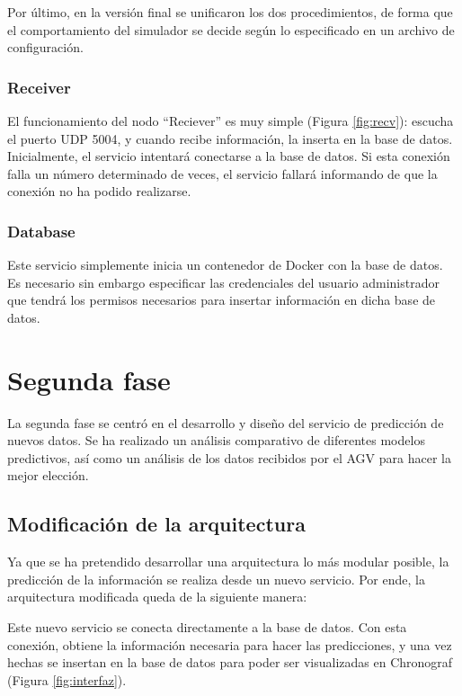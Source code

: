 Por último, en la versión final se unificaron los dos procedimientos, de forma que el comportamiento del simulador
se decide según lo especificado en un archivo de configuración.

\subsubsection{Receiver}

El funcionamiento del nodo ``Reciever'' es muy simple (Figura \ref*{fig:recv}): escucha el puerto UDP 5004, y cuando recibe información, la inserta 
en la base de datos. Inicialmente, el servicio intentará conectarse a la base de datos. Si esta conexión falla un número
determinado de veces, el servicio fallará informando de que la conexión no ha podido realizarse.


\subsubsection{Database}

Este servicio simplemente inicia un contenedor de Docker con la base de datos. Es necesario sin embargo 
especificar las credenciales del usuario administrador que tendrá los permisos necesarios para insertar 
información en dicha base de datos.

\section{Segunda fase}

La segunda fase se centró en el desarrollo y diseño del servicio de predicción de nuevos datos.
Se ha realizado un análisis comparativo de diferentes modelos predictivos, así como un análisis
de los datos recibidos por el AGV para hacer la mejor elección.

\subsection{Modificación de la arquitectura}

Ya que se ha pretendido desarrollar una arquitectura lo más modular posible, la predicción de la 
información se realiza desde un nuevo servicio. Por ende, la arquitectura modificada queda de la 
siguiente manera:


Este nuevo servicio se conecta directamente a la base de datos. Con esta conexión, obtiene la 
información necesaria para hacer las predicciones, y una vez hechas se insertan en la base de datos 
para poder ser visualizadas en Chronograf (Figura \ref{fig:interfaz}).

